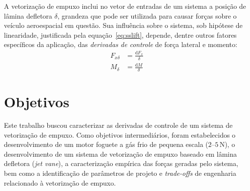 A vetorização de empuxo inclui no vetor de entradas de um sistema a posição de lâmina defletora \(\delta \), grandeza que pode ser utilizada para causar forças sobre o veículo aeroespacial em questão. Sua influência sobre o sistema, sob hipótese de linearidade, justificada pela equação~\ref{eq:sslift}, depende, dentre outros fatores específicos da aplicação, das \textit{derivadas de controle} de força lateral e momento:
\begin{align}
    F_{x\delta} &= \frac{\mathrm{d}F_x}{\delta} \\
    M_{\delta} &= \frac{\mathrm{d}M}{\delta}
\end{align}

\section{Objetivos}

Este trabalho buscou caracterizar as derivadas de controle de um sistema de vetorização de empuxo. Como objetivos intermediários, foram estabelecidos o desenvolvimento de um motor foguete a gás frio de pequena escala (\(2\)--\(5\,\mathrm{N}\)), o desenvolvimento de um sistema de vetorização de empuxo baseado em lâmina defletora (\textit{jet vane}), a caracterização empírica das forças geradas pelo sistema, bem como a identificação de parâmetros de projeto e \textit{trade-offs} de engenharia relacionado à vetorização de empuxo.